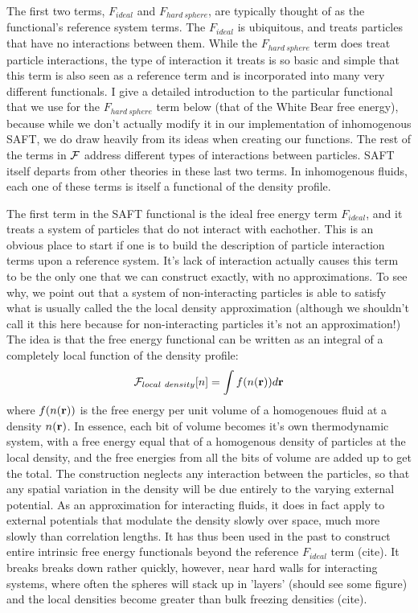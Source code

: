 The first two terms, $F_{ideal}$ and $F_{hard~sphere}$, are typically
thought of as the functional's reference system terms.  The
$F_{ideal}$ is ubiquitous, and treats particles that have no
interactions between them.  While the $F_{hard~sphere}$ term does
treat particle interactions, the type of interaction it treats is so
basic and simple that this term is also seen as a reference term and
is incorporated into many very different functionals.  I give a
detailed introduction to the particular functional that we use for the
$F_{hard~sphere}$ term below (that of the White Bear free energy),
because while we don't actually modify it in our implementation of
inhomogenous SAFT, we do draw heavily from its ideas when creating our
functions.  The rest of the terms in $\mathcal{F}$ address different types of
interactions between particles.  SAFT itself departs from other
theories in these last two terms.  In inhomogenous fluids, each one of
these terms is itself a functional of the density profile.


The first term in the SAFT functional is the ideal free energy term
$F_{ideal}$, and it treats a system of particles that do not interact
with eachother.  This is an obvious place to start if one is to build
the description of particle interaction terms upon a reference system.
It's lack of interaction actually causes this term to be the only one
that we can construct exactly, with no approximations.  To see why, we
point out that a system of non-interacting particles is able to
satisfy what is usually called the the local density approximation
(although we shouldn't call it this here because for non-interacting
particles it's not an approximation!)  The idea is that the free
energy functional can be written as an integral of a completely local
function of the density profile:
\begin{align}
  \mathcal{F}_{local~density}[n] = \int f(n(\textbf{r})) d\textbf{r}
\end{align}
where $f(n(\textbf{r}))$ is the free energy per unit volume of a homogenoues
fluid at a density $n(\textbf{r})$.  In essence, each bit of volume becomes
it's own thermodynamic system, with a free energy equal that of a
homogenous density of particles at the local density, and the free
energies from all the bits of volume are added up to get the total.
The construction neglects any interaction between the particles, so
that any spatial variation in the density will be due entirely to the
varying external potential.  As an approximation for interacting
fluids, it does in fact apply to external potentials that modulate the
density slowly over space, much more slowly than correlation lengths.
It has thus been used in the past to construct entire intrinsic free
energy functionals beyond the reference $F_{ideal}$ term (cite).  It
breaks breaks down rather quickly, however, near hard walls for
interacting systems, where often the spheres will stack up in 'layers'
(should see some figure) and the local densities become greater than
bulk freezing densities (cite).

